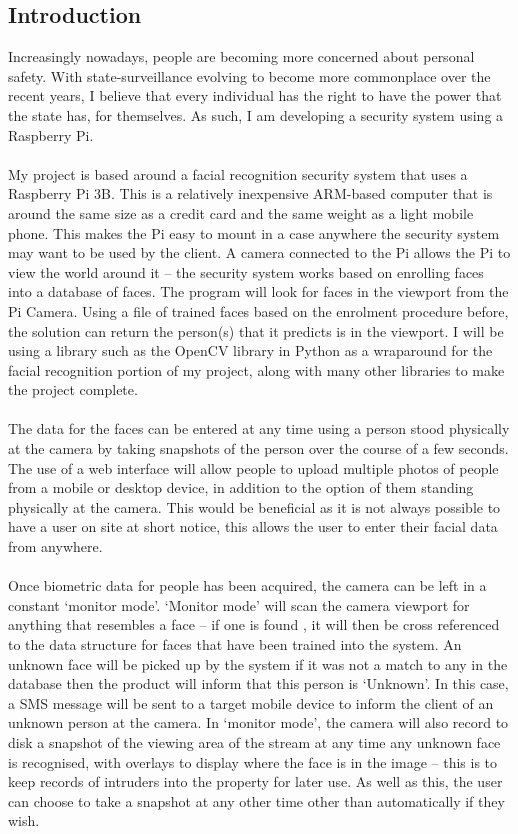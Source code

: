 \documentclass[9pt]{article}
\begin{document}
\subsection{Introduction}
Increasingly nowadays, people are becoming more concerned about personal safety. With state-surveillance evolving to become more commonplace over the recent years, I believe that every individual has the right to have the power that the state has, for themselves. As such, I am developing a security system using a Raspberry Pi.\\\\
My project is based around a facial recognition security system that uses a Raspberry Pi 3B. This is a relatively inexpensive ARM-based computer that is around the same size as a credit card and the same weight as a light mobile phone. This makes the Pi easy to mount in a case anywhere the security system may want to be used by the client. A camera connected to the Pi allows the Pi to view the world around it -- the security system works based on enrolling faces into a database of faces. The program will look for faces in the viewport from the Pi Camera. Using a file of trained faces based on the enrolment procedure before, the solution can return the person(s) that it predicts is in the viewport. I will be using a library such as the OpenCV library in Python as a wraparound for the facial recognition portion of my project, along with many other libraries to make the project complete.\\\\
The data for the faces can be entered at any time using a person stood physically at the camera by taking snapshots of the person over the course of a few seconds. The use of a web interface will allow people to upload multiple photos of people from a mobile or desktop device, in addition to the option of them standing physically at the camera. This would be beneficial as it is not always possible to have a user on site at short notice, this allows the user to enter their facial data from anywhere.\\\\
Once biometric data for people has been acquired, the camera can be left in a constant `monitor mode’. `Monitor mode’ will scan the camera viewport for anything that resembles a face – if one is found , it will then be cross referenced to the data structure for faces that have been trained into the system. An unknown face will be picked up by the system if it was not a match to any in the database then the product will inform that this person is `Unknown'. In this case, a SMS message will be sent to a target mobile device to inform the client of an unknown person at the camera. In ‘monitor mode’, the camera will also record to disk a snapshot of the viewing area of the stream at any time any unknown face is recognised, with overlays to display where the face is in the image – this is to keep records of intruders into the property for later use. As well as this, the user can choose to take a snapshot at any other time other than automatically if they wish.\\\\
\end{document}
